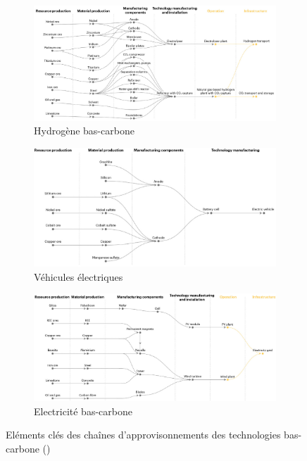 \begin{figure}[!t]
\centering
\begin{subfigure}{0.9\textwidth}
    \includegraphics[width=\textwidth]{Images/supply_chain/key_elements_h2.jpg}
    \caption{Hydrogène bas-carbone}
    \label{fig:h2_key_elements}
\end{subfigure}
\hfill
\begin{subfigure}{0.9\textwidth}
    \includegraphics[width=\textwidth]{Images/supply_chain/key_elements_VE.jpg}
    \caption{Véhicules électriques}
    \label{fig:EV_key_elements}
\end{subfigure}
\hfill
\begin{subfigure}{0.9\textwidth}
    \includegraphics[width=\textwidth]{Images/supply_chain/key_elements_electricity.jpg}
    \caption{Electricité bas-carbone}
    \label{fig:electricity_key_elements}
\end{subfigure}  
\caption{Eléments clés des chaînes d'approvisonnements des technologies bas-carbone (\cite{iea_energy_2023})\\}
\label{fig:supply_key_elements}
\end{figure}
